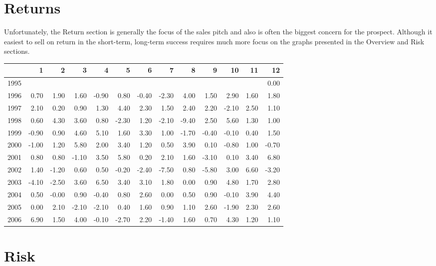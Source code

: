\documentclass[nohyper,justified]{tufte-handout}
\begin{document}
\newpage
\section{Returns}
Unfortunately, the Return section is generally the focus of the sales pitch and also is often the biggest concern for the prospect.  Although it easiest to sell on return in the short-term, long-term success requires much more focus on the graphs presented in the Overview and Risk sections.
\begin{table}[htb]
\centering
\begin{tabular}{rrrrrrrrrrrrr}
  \hline
 & 1 & 2 & 3 & 4 & 5 & 6 & 7 & 8 & 9 & 10 & 11 & 12 \\ 
  \hline
1995 &  &  &  &  &  &  &  &  &  &  &  & 0.00 \\ 
  1996 & 0.70 & 1.90 & 1.60 & -0.90 & 0.80 & -0.40 & -2.30 & 4.00 & 1.50 & 2.90 & 1.60 & 1.80 \\ 
  1997 & 2.10 & 0.20 & 0.90 & 1.30 & 4.40 & 2.30 & 1.50 & 2.40 & 2.20 & -2.10 & 2.50 & 1.10 \\ 
  1998 & 0.60 & 4.30 & 3.60 & 0.80 & -2.30 & 1.20 & -2.10 & -9.40 & 2.50 & 5.60 & 1.30 & 1.00 \\ 
  1999 & -0.90 & 0.90 & 4.60 & 5.10 & 1.60 & 3.30 & 1.00 & -1.70 & -0.40 & -0.10 & 0.40 & 1.50 \\ 
  2000 & -1.00 & 1.20 & 5.80 & 2.00 & 3.40 & 1.20 & 0.50 & 3.90 & 0.10 & -0.80 & 1.00 & -0.70 \\ 
  2001 & 0.80 & 0.80 & -1.10 & 3.50 & 5.80 & 0.20 & 2.10 & 1.60 & -3.10 & 0.10 & 3.40 & 6.80 \\ 
  2002 & 1.40 & -1.20 & 0.60 & 0.50 & -0.20 & -2.40 & -7.50 & 0.80 & -5.80 & 3.00 & 6.60 & -3.20 \\ 
  2003 & -4.10 & -2.50 & 3.60 & 6.50 & 3.40 & 3.10 & 1.80 & 0.00 & 0.90 & 4.80 & 1.70 & 2.80 \\ 
  2004 & 0.50 & -0.00 & 0.90 & -0.40 & 0.80 & 2.60 & 0.00 & 0.50 & 0.90 & -0.10 & 3.90 & 4.40 \\ 
  2005 & 0.00 & 2.10 & -2.10 & -2.10 & 0.40 & 1.60 & 0.90 & 1.10 & 2.60 & -1.90 & 2.30 & 2.60 \\ 
  2006 & 6.90 & 1.50 & 4.00 & -0.10 & -2.70 & 2.20 & -1.40 & 1.60 & 0.70 & 4.30 & 1.20 & 1.10 \\ 
   \hline
\end{tabular}%
\end{table}
\newpage
\section{Risk}
\end{document}
